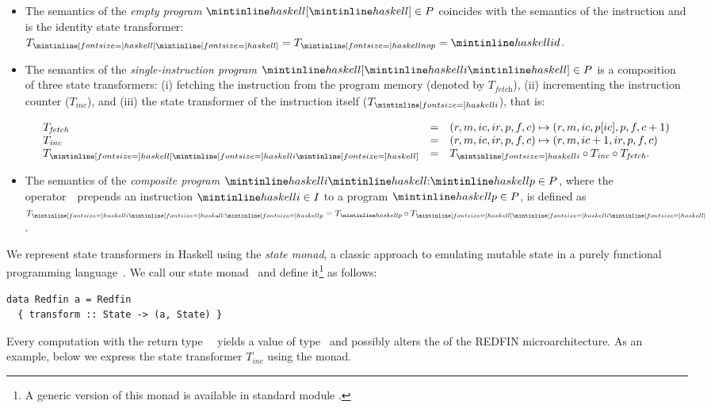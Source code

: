 \begin{itemize}
    \item The semantics of the \emph{empty program} $\hs{[}\hs{]} \in P$ coincides with
    the semantics of the instruction  and is the identity state transformer:
    $T_{\subhs{[}\subhs{]}} = T_{\subhs{nop}} = \hs{id}$.
    
    \item The semantics of the \emph{single-instruction program} $\hs{[}\hs{i}\hs{]} \in P$
    is a composition of three state transformers: (i) fetching the instruction from
    the program memory (denoted by $T_\textit{fetch}$), (ii) incrementing the
    instruction counter ($T_\textit{inc}$), and (iii) the state transformer
    of the instruction itself ($T_{\subhs{i}}$), that is:
    
    \[
    \begin{array}{lcl}
    T_\textit{fetch} & = & (r, m, ic, ir, p, f, c) \mapsto (r, m, ic, p[ic], p, f, c + 1)\\
    T_\textit{inc} & = & (r, m, ic, ir, p, f, c) \mapsto (r, m, ic + 1, ir, p, f, c)\\
    T_{\subhs{[}\subhs{i}\subhs{]}} & = & T_{\subhs{i}} \circ T_\textit{inc} \circ T_\textit{fetch}.\\
    \end{array}
    \]
    
    \item The semantics of the \emph{composite program} $\hs{i}\hs{:}\hs{p} \in P$,
    where the operator~\hs{:}~prepends an instruction $\hs{i} \in I$ to a program
    $\hs{p} \in P$, is defined as $T_{\subhs{i}\subhs{:}\subhs{p}} = T_{\hs{p}} \circ T_{\subhs{[}\subhs{i}\subhs{]}}$.
    
\end{itemize}

\noindent
We represent state transformers in Haskell using the \emph{state monad}, a
classic approach to emulating mutable state in a purely functional programming
language~\cite{wadler1990comprehending}. We call our state monad~ and
define it\footnote{A generic version of this monad is available in standard module
.} as follows:


\begin{verbatim}
data Redfin a = Redfin
  { transform :: State -> (a, State) }
\end{verbatim}


\noindent
Every computation with the return type~~ yields a value of type~
and possibly alters the  of the REDFIN microarchitecture. As an example,
below we express the state transformer $T_\textit{inc}$ using the  monad.



